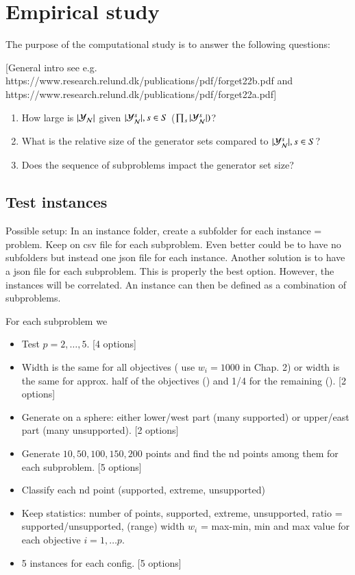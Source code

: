 \section{Empirical study}

The purpose of the computational study is to answer the following questions:

[General intro see e.g. https://www.research.relund.dk/publications/pdf/forget22b.pdf and https://www.research.relund.dk/publications/pdf/forget22a.pdf]

\begin{enumerate}
    \item How large is $|\mathcal{Y}_{\mathcal{N}}|$ given $|\mathcal{Y}_{\mathcal{N}}^s|, s\in S$ ($\prod_s |\mathcal{Y}_{\mathcal{N}}^s|)$?
    \item What is the relative size of the generator sets compared to $|\mathcal{Y}_{\mathcal{N}}^s|, s\in S$?
    \item Does the sequence of subproblems impact the generator set size? 
\end{enumerate}

\subsection{Test instances}

Possible setup: In an instance folder, create a subfolder for each instance = problem. Keep on csv file for each subproblem. Even better could be to have no subfolders but instead one json file for each instance. Another solution is to have a json file for each subproblem. This is properly the best option. However, the instances will be correlated. An instance can then be defined as a combination of subproblems.

For each subproblem we

\begin{itemize}
    \item Test $p=2,\ldots, 5$. [4 options]
    \item Width is the same for all objectives (\cite{Kerberenes2022phd} use $w_i=1000$ in Chap. 2) or width is the same for approx. half of the objectives () and 1/4 for the remaining (). [2 options]
    \item Generate on a sphere: either lower/west part (many supported) or upper/east part (many unsupported). [2 options]
    \item Generate $10, 50, 100, 150, 200$ points and find the nd points among them for each subproblem. [5 options]
    \item Classify each nd point (supported, extreme, unsupported)
    \item Keep statistics: number of points, supported, extreme, unsupported, ratio = supported/unsupported, (range) width $w_i$ = max-min, min and max value for each objective $i = 1,\ldots p$.
    \item 5 instances for each config. [5 options]
\end{itemize}

